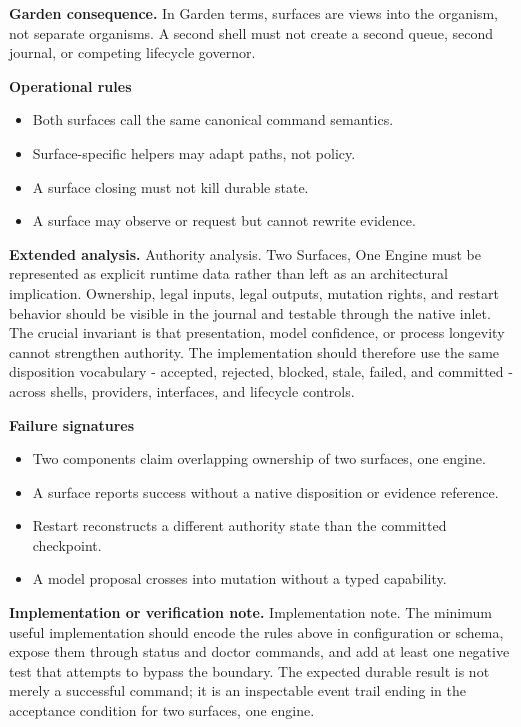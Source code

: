 \documentclass[10pt,letterpaper,oneside]{article}
\begin{document}
\textbf{Garden consequence.} In Garden terms, surfaces are views into the organism, not separate organisms. A second shell must not create a second queue, second journal, or competing lifecycle governor.

\textbf{Operational rules}
\begin{itemize}
\item Both surfaces call the same canonical command semantics.
\item Surface-specific helpers may adapt paths, not policy.
\item A surface closing must not kill durable state.
\item A surface may observe or request but cannot rewrite evidence.
\end{itemize}
\textbf{Extended analysis.} Authority analysis. Two Surfaces, One Engine must be represented as explicit runtime data rather than left as an architectural implication. Ownership, legal inputs, legal outputs, mutation rights, and restart behavior should be visible in the journal and testable through the native inlet. The crucial invariant is that presentation, model confidence, or process longevity cannot strengthen authority. The implementation should therefore use the same disposition vocabulary - accepted, rejected, blocked, stale, failed, and committed - across shells, providers, interfaces, and lifecycle controls.

\textbf{Failure signatures}
\begin{itemize}
\item Two components claim overlapping ownership of two surfaces, one engine.
\item A surface reports success without a native disposition or evidence reference.
\item Restart reconstructs a different authority state than the committed checkpoint.
\item A model proposal crosses into mutation without a typed capability.
\end{itemize}
\textbf{Implementation or verification note.} Implementation note. The minimum useful implementation should encode the rules above in configuration or schema, expose them through status and doctor commands, and add at least one negative test that attempts to bypass the boundary. The expected durable result is not merely a successful command; it is an inspectable event trail ending in the acceptance condition for two surfaces, one engine.
\end{document}
